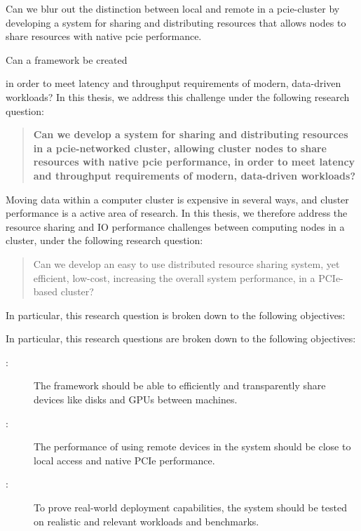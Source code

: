     
	Can we blur out the distinction between local and remote in a \gls{pcie}-cluster by developing a system for sharing and distributing resources
	that allows nodes to share resources with native \gls{pcie} performance.


Can a framework be created

	in order to meet latency and throughput requirements of modern, data-driven workloads?
In this thesis, we address this challenge under the following research question:
\begin{quote}\bfseries
	Can we develop a system for sharing and distributing resources in a \gls{pcie}-networked cluster, allowing cluster nodes to share resources with native \gls{pcie} performance,
	in order to meet latency and throughput requirements of modern, data-driven workloads?
\end{quote}

Moving data within a computer cluster is expensive in several ways, and cluster performance is a active area of research. 
In this thesis, we therefore address the resource sharing and IO performance challenges between computing nodes in a cluster, under the following research question: 



\begin{quote}
    Can we develop an easy to use distributed resource sharing system, yet efficient, low-cost, increasing the overall system performance, in a PCIe-based cluster?
\end{quote}


In particular, this research question is broken down to the following objectives:



In particular, this research questions are broken down to the following objectives:
\begin{description}
	\item[:] The framework should be able to efficiently and transparently share devices like disks and GPUs between machines.
	\item[:] The performance of using remote devices in the system should be close to local access and native PCIe performance.
	\item[:] To prove real-world deployment capabilities, the system should be tested on realistic and relevant workloads and benchmarks.
	
\end{description}

